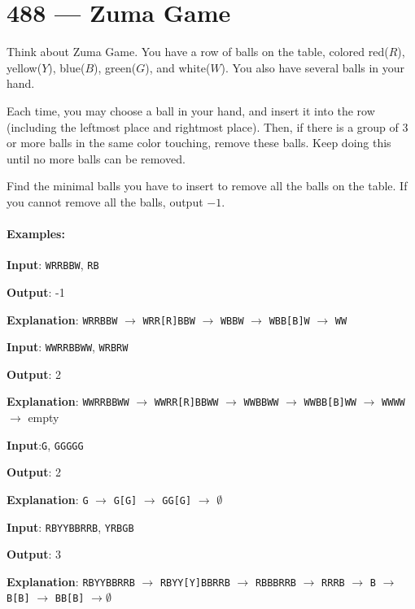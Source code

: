 \section{488 --- Zuma Game}
Think about Zuma Game. You have a row of balls on the table, colored red($ R $), yellow($ Y $), blue($ B $), green($ G $), and white($ W $). You also have several balls in your hand.

Each time, you may choose a ball in your hand, and insert it into the row (including the leftmost place and rightmost place). Then, if there is a group of 3 or more balls in the same color touching, remove these balls. Keep doing this until no more balls can be removed.

Find the minimal balls you have to insert to remove all the balls on the table. If you cannot remove all the balls, output $-1$.

\paragraph{Examples:}

\begin{flushleft}

\textbf{Input}: \texttt{WRRBBW}, \texttt{RB}

\textbf{Output}: -1

\textbf{Explanation}: \texttt{WRRBBW} $\rightarrow$ \texttt{WRR[R]BBW} $\rightarrow$ \texttt{WBBW} $ \rightarrow $ \texttt{WBB[B]W} $ \rightarrow $ \texttt{WW}

\textbf{Input}: \texttt{WWRRBBWW}, \texttt{WRBRW}

\textbf{Output}: 2

\textbf{Explanation}: \texttt{WWRRBBWW} $\longrightarrow$ \texttt{WWRR[R]BBWW} $\longrightarrow$ \texttt{WWBBWW} $\longrightarrow$ \texttt{WWBB[B]WW} $\longrightarrow$ \texttt{WWWW} $\longrightarrow$ empty

\textbf{Input}:\texttt{G}, \texttt{GGGGG}

\textbf{Output}: 2

\textbf{Explanation}: \texttt{G} $\longrightarrow$ \texttt{G[G]} $\longrightarrow$ \texttt{GG[G]} $\longrightarrow$ $\emptyset$


\textbf{Input}: \texttt{RBYYBBRRB}, \texttt{YRBGB}

\textbf{Output}: 3

\textbf{Explanation}: \texttt{RBYYBBRRB} $\longrightarrow$ \texttt{RBYY[Y]BBRRB} $\longrightarrow$ \texttt{RBBBRRB} $\longrightarrow$ \texttt{RRRB} $\longrightarrow$ \texttt{B} $\longrightarrow$ \texttt{B[B]} $\longrightarrow$ \texttt{BB[B]} $\longrightarrow \emptyset$

\end{flushleft}

